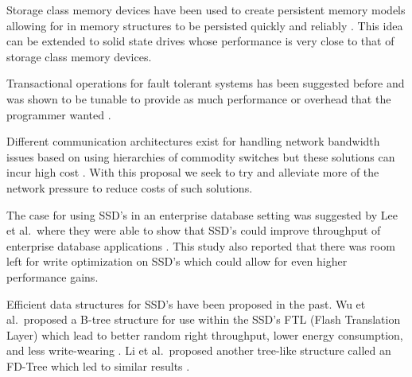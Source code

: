 \documentclass[letterpaper,12pt]{article}
\begin{document}
Storage class memory devices have been used to create persistent
memory models allowing for in memory structures to be persisted
quickly and reliably \cite{Mnemosyne}. This idea can be extended to
solid state drives whose performance is very close to that of storage
class memory devices.

Transactional operations for fault tolerant systems has been suggested
before and was shown to be tunable to provide as much performance or
overhead that the programmer wanted \cite{FaulTM}.

Different communication architectures exist for handling network
bandwidth issues based on using hierarchies of commodity switches but
these solutions can incur high cost \cite{Network}. With this proposal
we seek to try and alleviate more of the network pressure to reduce
costs of such solutions.

The case for using SSD's in an enterprise database setting was
suggested by Lee et al.\ where they were able to show that SSD's could
improve throughput of enterprise database applications
\cite{EnterpriseSSD}. This study also reported that there was room
left for write optimization on SSD's which could allow for even higher
performance gains.

Efficient data structures for SSD's have been proposed in the past. Wu
et al.\ proposed a B-tree structure for use within the SSD's FTL (Flash
Translation Layer) which lead to better random right throughput, lower
energy consumption, and less write-wearing \cite{FlashB-Tree}. Li et
al.\ proposed another tree-like structure called an FD-Tree which led
to similar results \cite{FD-Tree}.




\end{document}
